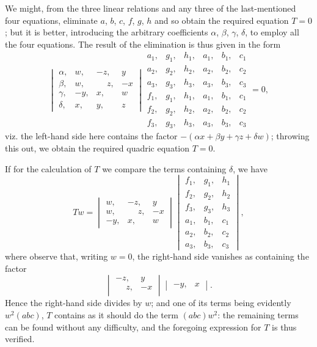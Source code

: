 \documentclass[11pt,a4paper]{book}
\begin{document}
We might, from the three linear relations and any three of the last-mentioned four equations, eliminate $a$, $b$, $c$, $f$, $g$, $h$ and so obtain the required equation $T = 0$; but it is better, introducing the arbitrary coefficients $\alpha$, $\beta$, $\gamma$, $\delta$, to employ all the four equations. The result of the elimination is thus given in the form
\[
\begin{vmatrix}
\alpha, & w, & -z, & y \\
\beta, & w, & \phantom{-}z, & -x \\
\gamma, & -y, & x, & w \\
\delta, & x, & y, & z
\end{vmatrix}
\begin{matrix}
a_1, & g_1, & h_1, & a_1, & b_1, & c_1 \\
a_2, & g_2, & h_2, & a_2, & b_2, & c_2 \\
a_3, & g_3, & h_3, & a_3, & b_3, & c_3 \\
f_1, & g_1, & h_1, & a_1, & b_1, & c_1 \\
f_2, & g_2, & h_2, & a_2, & b_2, & c_2 \\
f_3, & g_3, & h_3, & a_3, & b_3, & c_3
\end{matrix} = 0,
\]
viz. the left-hand side here contains the factor $-(\alpha x + \beta y + \gamma z + \delta w)$; throwing this out, we obtain the required quadric equation $T=0$.

If for the calculation of $T$ we compare the terms containing $\delta$, we have
\[
Tw =
\begin{vmatrix}
w, & -z, & y \\
w, & \phantom{-}z, & -x \\
-y, & x, & w
\end{vmatrix}
\begin{vmatrix}
f_1, & g_1, & h_1 \\
f_2, & g_2, & h_2 \\
f_3, & g_3, & h_3 \\
a_1, & b_1, & c_1 \\
a_2, & b_2, & c_2 \\
a_3, & b_3, & c_3
\end{vmatrix},
\]
where observe that, writing $w = 0$, the right-hand side vanishes as containing the factor
\[
\begin{vmatrix} -z, & y \\ \phantom{-}z, & -x \\ \end{vmatrix}
\begin{vmatrix} -y, & x \end{vmatrix}.
\]
Hence the right-hand side divides by $w$; and one of its terms being evidently $w^2 (abc)$, $T$ contains as it should do the term $(abc)w^2$: the remaining terms can be found without any difficulty, and the foregoing expression for $T$ is thus verified.
\end{document}
